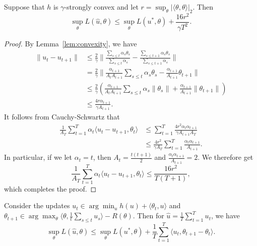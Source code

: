 \documentclass{article}
\begin{document}
\begin{corollary}
\label{cor:method-1}
Suppose that $h$ is $\gamma$-strongly convex and let $r = \sup_{\theta} |\langle \theta, \theta \rangle|_2$. Then 
\[ \sup_{\theta} L(\hat{u}, \theta) \leq \sup_{\theta} L(u^*, \theta) + \frac{16r^2}{\gamma T^2}. \]
\end{corollary}
\begin{proof}
By Lemma~\ref{lem:convexity}, we have 
\begin{align*}
\|u_t-u_{t+1}\| &\leq \frac{2}{\gamma}\|\frac{\sum_{s \leq t}\alpha_s\theta_s}{\sum_{s \leq t} \alpha_s} - \frac{\sum_{s \leq t+1}\alpha_s\theta_s}{\sum_{s \leq t+1} \alpha_s}\| \\
 &= \frac{2}{\gamma}\|\frac{\alpha_{t+1}}{A_tA_{t+1}} \sum_{s \leq t} \alpha_s\theta_s - \frac{\alpha_{t+1}}{A_{t+1}} \theta_{t+1}\| \\
 &\leq \frac{2}{\gamma} \left(\frac{\alpha_{t+1}}{A_tA_{t+1}} \sum_{s \leq t} \alpha_s\|\theta_s\| + \frac{\alpha_{t+1}}{A_{t+1}} \|\theta_{t+1}\|\right) \\
 &\leq \frac{4r\alpha_{t+1}}{\gamma A_{t+1}}.
\end{align*}
It follows from Cauchy-Schwartz that 
\begin{align*}
\frac{1}{A_T} \sum_{t=1}^T \alpha_t \langle u_t - u_{t+1}, \theta_t \rangle &\leq \sum_{t=1}^T \frac{4r^2\alpha_{t}\alpha_{t+1}}{\gamma A_{t+1}A_T} \\
 &\leq \frac{4r^2}{\gamma A_T} \sum_{t=1}^T \frac{\alpha_{t}\alpha_{t+1}}{A_{t+1}}.
\end{align*}
In particular, if we let $\alpha_t = t$, then $A_t = \frac{t(t+1)}{2}$ and $\frac{\alpha_{t}\alpha_{t+1}}{A_{t+1}} = 2$. 
We therefore get
\begin{equation}
\frac{1}{A_T} \sum_{t=1}^T \alpha_t\langle u_t-u_{t+1}, \theta_t \rangle \leq \frac{16r^2}{T(T+1)},
\end{equation}
which completes the proof.
\end{proof}
\begin{proposition}
\label{prop:method-2}
Consider the updates $u_t \in \arg\min_{u} h(u) + \langle \theta_t, u \rangle$ 
and $\theta_{t+1} \in \arg\max_{\theta} \langle \theta, \frac{1}{t} \sum_{s \leq t} u_s \rangle - R(\theta)$. 
Then for $\hat{u} = \frac{1}{T} \sum_{t=1}^T u_t$, we have 
\[ \sup_{\theta} L(\hat{u}, \theta) \leq \sup_{\theta} L(u^*, \theta) + \frac{1}{T} \sum_{t=1}^T \langle u_t, \theta_{t+1} - \theta_{t} \rangle. \]
\end{proposition}
\end{document}
